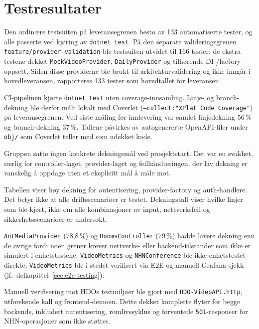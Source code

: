 \section{Testresultater}
\label{sec:testresultater}

Den ordinære testsuiten på leveransegrenen besto av 133 automatiserte
tester, og alle passerte ved kjøring av \texttt{dotnet test}. På den
separate valideringsgrenen \texttt{feature/provider-validation} ble
testsuiten utvidet til 166 tester; de ekstra testene dekket
\texttt{MockVideoProvider}, \texttt{DailyProvider} og tilhørende
DI-/factory-oppsett. Siden disse providerne ble brukt til
arkitekturvalidering og ikke inngår i hovedleveransen, rapporteres 133
tester som hovedtallet for leveransen.



CI-pipelinen kjørte \texttt{dotnet test} uten coverage-innsamling. Linje-
og branch-dekning ble derfor målt lokalt med Coverlet
(\texttt{--collect:"XPlat Code Coverage"}) på leveransegrenen.
Ved siste måling før innlevering var samlet linjedekning 56\,\% og
branch-dekning 37\,\%. Tallene påvirkes av autogenererte OpenAPI-filer
under \texttt{obj/} som Coverlet teller med som udekket kode.

Gruppen satte ingen konkrete dekningsmål ved prosjektstart. Det var en
svakhet, særlig for controller-laget, provider-laget og feilhåndteringen,
der lav dekning er vanskelig å oppdage uten et eksplisitt mål å måle mot.

Tabellen viser høy dekning for autentisering, provider-factory og
auth-handlere. Det betyr ikke at alle driftsscenarioer er testet.
Dekningstall viser hvilke linjer som ble kjørt, ikke om alle kombinasjoner
av input, nettverksfeil og sikkerhetsscenarioer er undersøkt.

\texttt{AntMediaProvider} (78,8\,\%) og \texttt{RoomsController}
(79\,\%) hadde lavere dekning enn de øvrige fordi noen grener krever
nettverks- eller backend-tilstander som ikke er simulert i enhetstestene.
\texttt{VideoMetrics} og \texttt{NHNConference} ble ikke enhetstestet
direkte; \texttt{VideoMetrics} ble i stedet verifisert via E2E og manuell
Grafana-sjekk (jf.\ delkapittel~\ref{sec:e2e-testing}).

Manuell verifisering mot HDOs testmiljøer ble gjort med
\texttt{HDO-VideoAPI.http}, utforskende kall og frontend-demoen.
Dette dekket komplette flyter for begge backends, inkludert autentisering,
romlivssyklus og forventede \texttt{501}-responser for NHN-operasjoner
som ikke støttes.